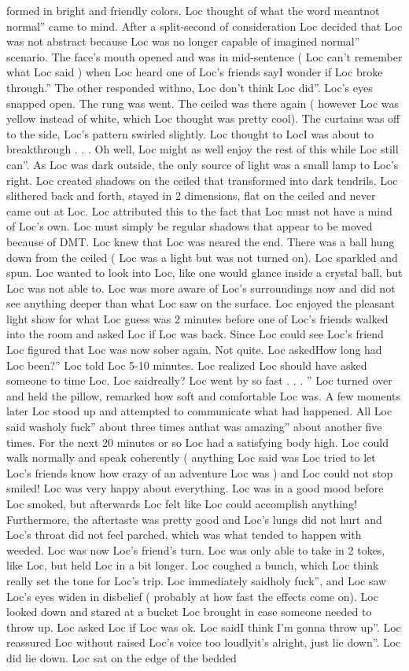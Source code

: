 \documentclass[12pt]{book}
\begin{document}
formed in bright and friendly colors. Loc thought of what the word meantnot normal'' came to mind. After a split-second of consideration Loc decided that Loc was not abstract because Loc was no longer capable of imagined normal'' scenario. The face's mouth opened and was in mid-sentence ( Loc can't remember what Loc said ) when Loc heard one of Loc's friends sayI wonder if Loc broke through.'' The other responded withno, Loc don't think Loc did''. Loc's eyes snapped open. The rung was went. The ceiled was there again ( however Loc was yellow instead of white, which Loc thought was pretty cool). The curtains was off to the side, Loc's pattern swirled slightly. Loc thought to LocI was about to breakthrough . . . Oh well, Loc might as well enjoy the rest of this while Loc still can''. As Loc was dark outside, the only source of light was a small lamp to Loc's right. Loc created shadows on the ceiled that transformed into dark tendrils. Loc slithered back and forth, stayed in 2 dimensions, flat on the ceiled and never came out at Loc. Loc attributed this to the fact that Loc must not have a mind of Loc's own. Loc must simply be regular shadows that appear to be moved because of DMT. Loc knew that Loc was neared the end. There was a ball hung down from the ceiled ( Loc was a light but was not turned on). Loc sparkled and spun. Loc wanted to look into Loc, like one would glance inside a crystal ball, but Loc was not able to. Loc was more aware of Loc's surroundings now and did not see anything deeper than what Loc saw on the surface. Loc enjoyed the pleasant light show for what Loc guess was 2 minutes before one of Loc's friends walked into the room and asked Loc if Loc was back. Since Loc could see Loc's friend Loc figured that Loc was now sober again. Not quite. Loc askedHow long had Loc been?'' Loc told Loc 5-10 minutes. Loc realized Loc should have asked someone to time Loc. Loc saidreally? Loc went by so fast . . . '' Loc turned over and held the pillow, remarked how soft and comfortable Loc was. A few moments later Loc stood up and attempted to communicate what had happened. All Loc said washoly fuck'' about three times anthat was amazing'' about another five times. For the next 20 minutes or so Loc had a satisfying body high. Loc could walk normally and speak coherently ( anything Loc said was Loc tried to let Loc's friends know how crazy of an adventure Loc was ) and Loc could not stop smiled! Loc was very happy about everything. Loc was in a good mood before Loc smoked, but afterwards Loc felt like Loc could accomplish anything! Furthermore, the aftertaste was pretty good and Loc's lungs did not hurt and Loc's throat did not feel parched, which was what tended to happen with weeded. Loc was now Loc's friend's turn. Loc was only able to take in 2 tokes, like Loc, but held Loc in a bit longer. Loc coughed a bunch, which Loc think really set the tone for Loc's trip. Loc immediately saidholy fuck'', and Loc saw Loc's eyes widen in disbelief ( probably at how fast the effects come on). Loc looked down and stared at a bucket Loc brought in case someone needed to throw up. Loc asked Loc if Loc was ok. Loc saidI think I'm gonna throw up''. Loc reassured Loc without raised Loc's voice too loudlyit's alright, just lie down''. Loc did lie down. Loc sat on the edge of the bedded 
\end{document}
